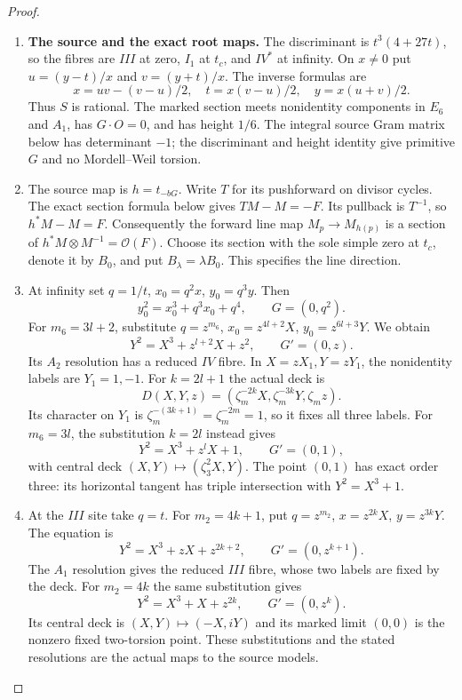 \begin{proof}
\begin{enumerate}[label=\arabic*.]
\item \par\medskip\noindent\textbf{The source and the exact root maps.}
The discriminant is $t^3(4+27t)$, so the fibres are $III$ at zero,
$I_1$ at $t_c$, and $IV^*$ at infinity. On $x\ne0$ put
$u=(y-t)/x$ and $v=(y+t)/x$. The inverse formulas are
\[
 x=uv-(v-u)/2,\quad t=x(v-u)/2,\quad y=x(u+v)/2.
\]
Thus $S$ is rational. The marked section meets nonidentity
components in $E_6$ and $A_1$, has $G\cdot O=0$, and has
height $1/6$. The integral source Gram matrix below has determinant
$-1$; the discriminant and height identity give primitive $G$
and no Mordell--Weil torsion.

\item The source map is $h=t_{-bG}$. Write $T$ for its pushforward on
divisor cycles. The exact section formula below gives
$TM-M=-F$. Its pullback is $T^{-1}$, so $h^*M-M=F$.
Consequently the forward line map $M_p\to M_{h(p)}$ is a section
of $h^*M\otimes M^{-1}=\mathcal O(F)$. Choose its section with
the sole simple zero at $t_c$, denote it by $B_0$, and put
$B_\lambda=\lambda B_0$. This specifies the line direction.

\item At infinity set $q=1/t$, $x_0=q^2x$, $y_0=q^3y$. Then
\[
 y_0^2=x_0^3+q^3x_0+q^4,\qquad G=(0,q^2).
\]
For $m_6=3l+2$, substitute
$q=z^{m_6}$, $x_0=z^{4l+2}X$, $y_0=z^{6l+3}Y$. We obtain
\[
 Y^2=X^3+z^{l+2}X+z^2,\qquad G'=(0,z).                         \tag{F46.3}
\]
Its $A_2$ resolution has a reduced $IV$ fibre. In
$X=zX_1,Y=zY_1$, the nonidentity labels are $Y_1=1,-1$.
For $k=2l+1$ the actual deck is
\[
 D(X,Y,z)=(\zeta_m^{-2k}X,\zeta_m^{-3k}Y,\zeta_m z).
\]
Its character on $Y_1$ is
$\zeta_m^{-(3k+1)}=\zeta_m^{-2m}=1$, so it fixes all
three labels. For $m_6=3l$, the substitution $k=2l$ instead gives
\[
 Y^2=X^3+z^lX+1,\qquad G'=(0,1),                               \tag{F46.4}
\]
with central deck $(X,Y)\mapsto(\zeta_3^2X,Y)$.
The point $(0,1)$ has exact order three: its horizontal tangent
has triple intersection with $Y^2=X^3+1$.

\item At the $III$ site take $q=t$. For $m_2=4k+1$, put
$q=z^{m_2}$, $x=z^{2k}X$, $y=z^{3k}Y$. The equation is
\[
 Y^2=X^3+zX+z^{2k+2},\qquad G'=(0,z^{k+1}).                    \tag{F46.5}
\]
The $A_1$ resolution gives the reduced $III$ fibre, whose two
labels are fixed by the deck. For $m_2=4k$ the same substitution
gives
\[
 Y^2=X^3+X+z^{2k},\qquad G'=(0,z^k).                           \tag{F46.6}
\]
Its central deck is $(X,Y)\mapsto(-X,iY)$ and its marked
limit $(0,0)$ is the nonzero fixed two-torsion point.
These substitutions and the stated resolutions are the actual
maps to the source models.


\end{enumerate}
\end{proof}
